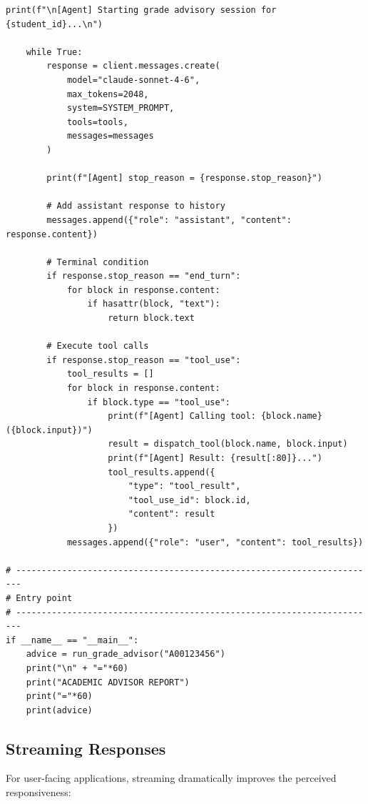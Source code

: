 \documentclass[11pt,letterpaper]{article}
\begin{document}
\begin{lstlisting}[style=PythonStyle, caption={Complete grade advisory agent}, label={lst:grade-agent}]
    print(f"\n[Agent] Starting grade advisory session for {student_id}...\n")

    while True:
        response = client.messages.create(
            model="claude-sonnet-4-6",
            max_tokens=2048,
            system=SYSTEM_PROMPT,
            tools=tools,
            messages=messages
        )

        print(f"[Agent] stop_reason = {response.stop_reason}")

        # Add assistant response to history
        messages.append({"role": "assistant", "content": response.content})

        # Terminal condition
        if response.stop_reason == "end_turn":
            for block in response.content:
                if hasattr(block, "text"):
                    return block.text

        # Execute tool calls
        if response.stop_reason == "tool_use":
            tool_results = []
            for block in response.content:
                if block.type == "tool_use":
                    print(f"[Agent] Calling tool: {block.name}({block.input})")
                    result = dispatch_tool(block.name, block.input)
                    print(f"[Agent] Result: {result[:80]}...")
                    tool_results.append({
                        "type": "tool_result",
                        "tool_use_id": block.id,
                        "content": result
                    })
            messages.append({"role": "user", "content": tool_results})

# -----------------------------------------------------------------------
# Entry point
# -----------------------------------------------------------------------
if __name__ == "__main__":
    advice = run_grade_advisor("A00123456")
    print("\n" + "="*60)
    print("ACADEMIC ADVISOR REPORT")
    print("="*60)
    print(advice)
\end{lstlisting}

\subsection{Streaming Responses}

For user-facing applications, streaming dramatically improves the perceived responsiveness:
\end{document}
